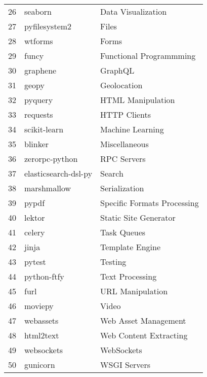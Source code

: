 \begin{longtable} {|l|l|l|}
    26 & seaborn & Data Visualization\\
    27 & pyfilesystem2 & Files\\
    28 & wtforms & Forms\\
    29 & funcy & Functional Programmming\\
    30 & graphene & GraphQL\\
    31 & geopy & Geolocation\\
    32 & pyquery & HTML Manipulation\\
    33 & requests & HTTP Clients\\
    34 & scikit-learn & Machine Learning\\
    35 & blinker & Miscellaneous\\
    36 & zerorpc-python & RPC Servers\\
    37 & elasticsearch-dsl-py & Search\\
    38 & marshmallow & Serialization\\
    39 & pypdf & Specific Formats Processing\\
    40 & lektor & Static Site Generator\\
    41 & celery & Task Queues\\
    42 & jinja & Template Engine\\
    43 & pytest & Testing\\
    44 & python-ftfy & Text Processing\\
    45 & furl & URL Manipulation\\
    46 & moviepy & Video\\
    47 & webassets & Web Asset Management\\
    48 & html2text & Web Content Extracting\\
    49 & websockets & WebSockets\\
    50 & gunicorn & WSGI Servers\\
 \end{longtable}
 